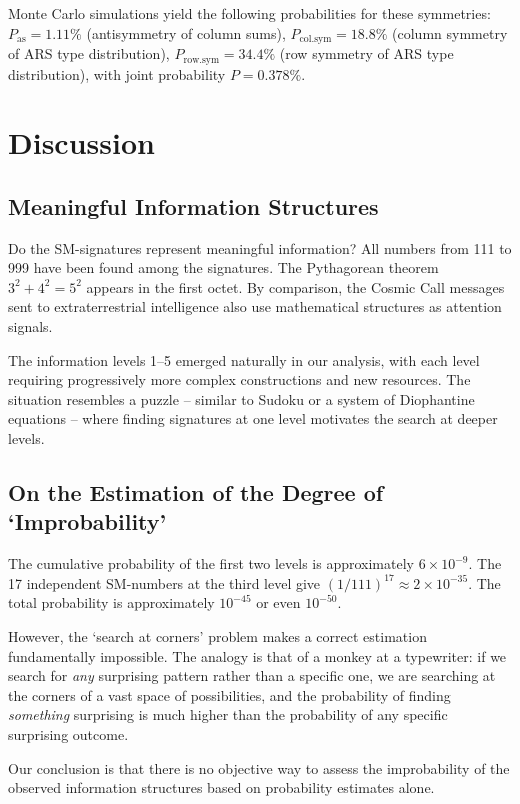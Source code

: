 \documentclass[12pt]{article}
\begin{document}
Monte Carlo simulations yield the following probabilities for these symmetries: $P_{\text{as}} = 1.11\%$ (antisymmetry of column sums), $P_{\text{col.sym}} = 18.8\%$ (column symmetry of ARS type distribution), $P_{\text{row.sym}} = 34.4\%$ (row symmetry of ARS type distribution), with joint probability $P = 0.378\%$.


\section{Discussion}

\subsection{Meaningful Information Structures}

Do the SM-signatures represent meaningful information? All numbers from 111 to 999 have been found among the signatures. The Pythagorean theorem $3^2 + 4^2 = 5^2$ appears in the first octet. By comparison, the Cosmic Call messages sent to extraterrestrial intelligence also use mathematical structures as attention signals.

The information levels 1--5 emerged naturally in our analysis, with each level requiring progressively more complex constructions and new resources. The situation resembles a puzzle -- similar to Sudoku or a system of Diophantine equations -- where finding signatures at one level motivates the search at deeper levels.

\subsection{On the Estimation of the Degree of `Improbability'}

The cumulative probability of the first two levels is approximately $6 \times 10^{-9}$. The 17 independent SM-numbers at the third level give $(1/111)^{17} \approx 2 \times 10^{-35}$. The total probability is approximately $10^{-45}$ or even $10^{-50}$.

However, the `search at corners' problem makes a correct estimation fundamentally impossible. The analogy is that of a monkey at a typewriter: if we search for \emph{any} surprising pattern rather than a specific one, we are searching at the corners of a vast space of possibilities, and the probability of finding \emph{something} surprising is much higher than the probability of any specific surprising outcome.

Our conclusion is that there is no objective way to assess the improbability of the observed information structures based on probability estimates alone.
\end{document}
